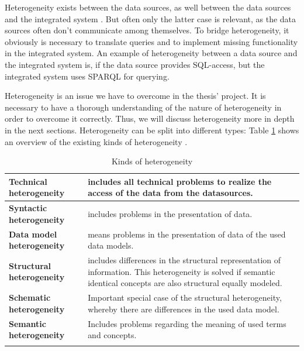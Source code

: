 Heterogeneity exists between the data sources, as well between the data sources and the integrated system \cite[p. 60]{DBLP:books/dp/LeserN2006}. But often only the latter case is relevant, as the data sources often don't communicate among themselves. To bridge heterogeneity, it obviously is necessary to translate queries and to implement missing functionality in the integrated system. An example of heterogeneity between a data source and the integrated system is, if the data source provides SQL-access, but the integrated system uses SPARQL for querying.

Heterogeneity is an issue we have to overcome in the thesis' project. It is necessary to have a thorough understanding of the nature of heterogeneity in order to overcome it correctly. Thus, we will discuss heterogeneity more in depth in the next sections. Heterogeneity can be split into different types: Table \ref{kinds-of-heterogeneity} shows an overview of the existing kinds of heterogeneity \cite[p. 60/61]{DBLP:books/dp/LeserN2006}.

\begin{longtable}{|l|p{}|}
\hline
 \textbf{Technical  heterogeneity}  &  includes all technical problems to realize the access of the data from the datasources.\\ \hline
 \textbf{Syntactic  heterogeneity}    &  includes problems in the presentation of data.\\ \hline
 \textbf{Data model  heterogeneity} &  means problems in the presentation of data of the used data models. \\ \hline
 \textbf{Structural  heterogeneity}    &  includes differences in the structural representation of information. This heterogeneity is solved if semantic identical concepts are also structural equally modeled. \\ \hline
 \textbf{Schematic  heterogeneity} &  Important special case of the structural heterogeneity, whereby there are differences in the used data model.\\ \hline
 \textbf{Semantic  heterogeneity}    &  Includes problems regarding the meaning of used terms and concepts.\\ \hline
\caption{Kinds of heterogeneity \cite[p. 60/61]{DBLP:books/dp/LeserN2006}}
\label{kinds-of-heterogeneity}
\end{longtable}

